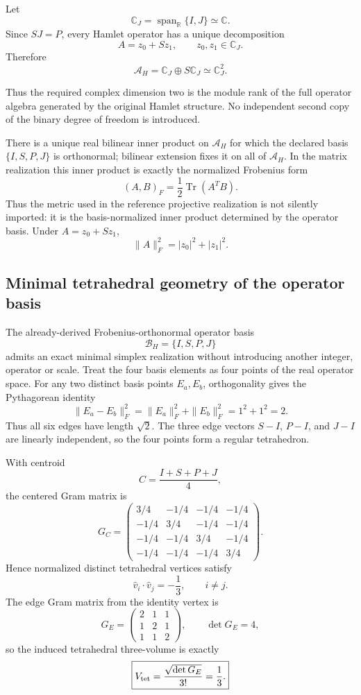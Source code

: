 \documentclass[11pt]{article}
\begin{document}
Let
\[
\mathbb C_J
=
\operatorname{span}_{\mathbb R}\{I,J\}
\simeq
\mathbb C.
\]
Since \(SJ=P\), every Hamlet operator has a unique decomposition
\[
A=z_0+Sz_1,
\qquad
z_0,z_1\in\mathbb C_J.
\]
Therefore
\[
\boxed{
\mathcal A_H
=
\mathbb C_J\oplus S\mathbb C_J
\simeq
\mathbb C_J^2.
}
\]

Thus the required complex dimension two is the module rank of the full
operator algebra generated by the original Hamlet structure. No independent
second copy of the binary degree of freedom is introduced.

There is a unique real bilinear inner product on
\(\mathcal A_H\) for which the declared basis
\(\{I,S,P,J\}\) is orthonormal; bilinear extension fixes it on all of
\(\mathcal A_H\). In the matrix realization this inner product is exactly
the normalized Frobenius form
\[
(A,B)_F
=
\frac12\operatorname{Tr}(A^TB).
\]
Thus the metric used in the reference projective realization is not silently
imported: it is the basis-normalized inner product determined by the operator
basis. Under
\(A=z_0+Sz_1\),
\[
\|A\|_F^2
=
|z_0|^2+|z_1|^2.
\]

\subsection{Minimal tetrahedral geometry of the operator basis}

The already-derived Frobenius-orthonormal operator basis
\[
\mathcal B_H=\{I,S,P,J\}
\]
admits an exact minimal simplex realization without introducing another
integer, operator or scale. Treat the four basis elements as four points of
the real operator space. For any two distinct basis points \(E_a,E_b\),
orthogonality gives the Pythagorean identity
\[
\boxed{
\|E_a-E_b\|_F^2
=
\|E_a\|_F^2+\|E_b\|_F^2
=
1^2+1^2
=
2.
}
\]
Thus all six edges have length \(\sqrt2\). The three edge vectors
\(S-I\), \(P-I\), and \(J-I\) are linearly independent, so the four
points form a regular tetrahedron.

With centroid
\[
C=\frac{I+S+P+J}{4},
\]
the centered Gram matrix is
\[
\boxed{
G_C=
\begin{pmatrix}
3/4&-1/4&-1/4&-1/4\\
-1/4&3/4&-1/4&-1/4\\
-1/4&-1/4&3/4&-1/4\\
-1/4&-1/4&-1/4&3/4
\end{pmatrix}.
}
\]
Hence normalized distinct tetrahedral vertices satisfy
\[
\boxed{
\widehat v_i\cdot\widehat v_j=-\frac13,
\qquad i\ne j.
}
\]
The edge Gram matrix from the identity vertex is
\[
G_E=
\begin{pmatrix}
2&1&1\\
1&2&1\\
1&1&2
\end{pmatrix},
\qquad
\det G_E=4,
\]
so the induced tetrahedral three-volume is exactly
\[
\boxed{
V_{\rm tet}
=
\frac{\sqrt{\det G_E}}{3!}
=
\frac13.
}
\]
\end{document}

